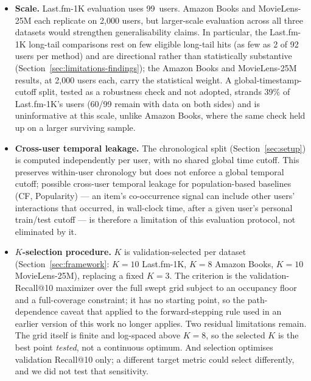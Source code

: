 \documentclass[11pt,a4paper]{article}
\begin{document}
\begin{itemize}[leftmargin=*, itemsep=3pt]
  \item \textbf{Scale.} Last.fm-1K evaluation uses 99~users. Amazon Books
        and MovieLens-25M each replicate on 2{,}000 users, but larger-scale
        evaluation across all three datasets would strengthen
        generalisability claims. In particular, the Last.fm-1K long-tail
        comparisons rest on few eligible long-tail hits (as few as 2 of 92
        users per method) and are directional rather than statistically
        substantive (Section~\ref{sec:limitations-findings}); the Amazon
        Books and MovieLens-25M results, at 2{,}000 users each, carry the
        statistical weight. A global-timestamp-cutoff split, tested as a
        robustness check and not adopted, strands 39\% of Last.fm-1K's
        users (60/99 remain with data on both sides) and is uninformative
        at this scale, unlike Amazon Books, where the same check held up
        on a larger surviving sample.
  \item \textbf{Cross-user temporal leakage.} The chronological split
        (Section~\ref{sec:setup}) is computed independently per user, with
        no shared global time cutoff. This preserves within-user
        chronology but does not enforce a global temporal cutoff; possible
        cross-user temporal leakage for population-based baselines (CF,
        Popularity) --- an item's co-occurrence signal can include other
        users' interactions that occurred, in wall-clock time, after a
        given user's personal train/test cutoff --- is therefore a
        limitation of this evaluation protocol, not eliminated by it.
  \item \textbf{$K$-selection procedure.} $K$ is validation-selected per
        dataset (Section~\ref{sec:framework}: $K=10$ Last.fm-1K,
        $K=8$ Amazon Books, $K=10$ MovieLens-25M), replacing a
        fixed $K=3$. The criterion is the validation-Recall@10 maximizer
        over the full swept grid subject to an occupancy floor and a
        full-coverage constraint; it has no starting point, so the
        path-dependence caveat that applied to the forward-stepping rule
        used in an earlier version of this work no longer applies. Two
        residual limitations remain. The grid itself is finite and
        log-spaced above $K=8$, so the selected $K$ is the best point
        \emph{tested}, not a continuous optimum. And selection optimises
        validation Recall@10 only; a different target metric could select
        differently, and we did not test that sensitivity.

\end{itemize}
\end{document}
